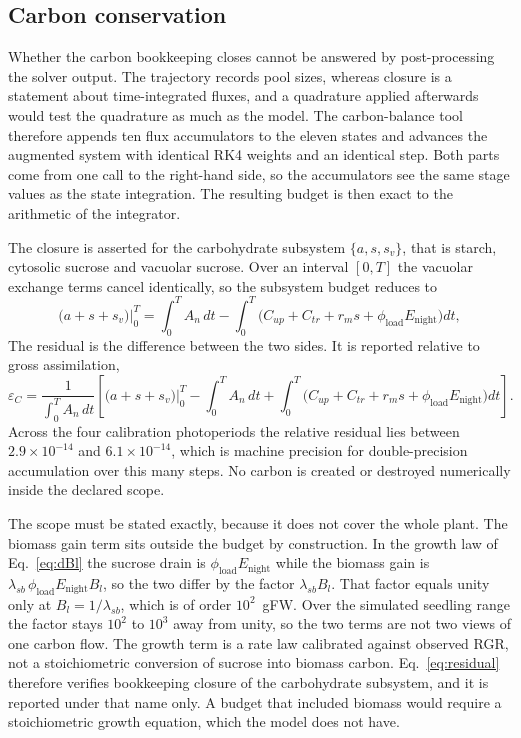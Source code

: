 \subsection{Carbon conservation}
\label{sec:carbon_closure}

Whether the carbon bookkeeping closes cannot be answered by post-processing the
solver output. The trajectory records pool sizes, whereas closure is a statement
about time-integrated fluxes, and a quadrature applied afterwards would test the
quadrature as much as the model. The carbon-balance tool therefore appends ten
flux accumulators to the eleven states and advances the augmented system with
identical RK4 weights and an identical step. Both parts come from one call to the
right-hand side, so the accumulators see the same stage values as the state
integration. The resulting budget is then exact to the arithmetic of the
integrator.

The closure is asserted for the carbohydrate subsystem
$\{a, s, s_v\}$, that is starch, cytosolic sucrose and vacuolar sucrose. Over an
interval $[0,T]$ the vacuolar exchange terms cancel identically, so the
subsystem budget reduces to
\begin{equation}
\bigl(a + s + s_v\bigr)\Big|_0^{T}
=
\int_0^{T} A_n \, dt
-
\int_0^{T}
\bigl( C_{up} + C_{tr} + r_m s + \phi_{\text{load}} E_{\text{night}} \bigr) dt ,
\label{eq:budget}
\end{equation}
The residual is the difference between the two sides. It is reported relative to
gross assimilation,
\begin{equation}
\varepsilon_{C}
=
\frac{1}{\int_0^{T} A_n \, dt}
\left[
\bigl(a + s + s_v\bigr)\Big|_0^{T}
-
\int_0^{T} A_n \, dt
+
\int_0^{T}
\bigl( C_{up} + C_{tr} + r_m s + \phi_{\text{load}} E_{\text{night}} \bigr) dt
\right].
\label{eq:residual}
\end{equation}
Across the four calibration photoperiods the relative residual lies between
$2.9\times10^{-14}$ and $6.1\times10^{-14}$, which is machine precision for
double-precision accumulation over this many steps. No carbon is created or
destroyed numerically inside the declared scope.

The scope must be stated exactly, because it does not cover the whole plant.
The biomass gain term sits outside the budget by construction. In the growth law
of Eq.~\eqref{eq:dBl} the sucrose drain is
$\phi_{\text{load}} E_{\text{night}}$ while the biomass gain is
$\lambda_{sb}\,\phi_{\text{load}} E_{\text{night}} B_l$, so the two differ by
the factor $\lambda_{sb} B_l$. That factor equals unity only at
$B_l = 1/\lambda_{sb}$, which is of order $10^{2}$~gFW. Over the simulated
seedling range the factor stays $10^{2}$ to $10^{3}$ away from unity, so the two
terms are not two views of one carbon flow. The growth
term is a rate law calibrated against observed RGR, not a stoichiometric
conversion of sucrose into biomass carbon. Eq.~\eqref{eq:residual} therefore
verifies bookkeeping closure of the carbohydrate subsystem, and it is reported
under that name only. A budget that included biomass would require a
stoichiometric growth equation, which the model does not have.

